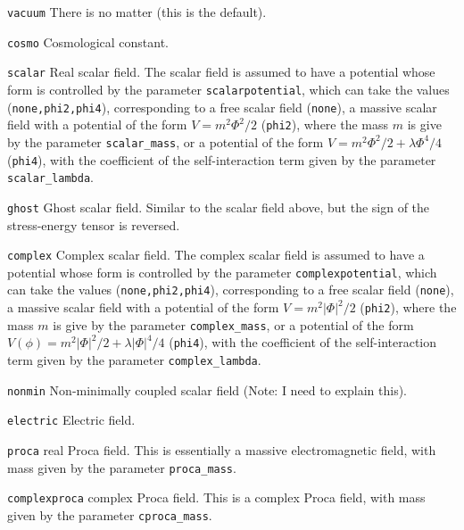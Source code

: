 \documentclass[12pt]{article}
\begin{document}
\begin{list}{}{
\setlength{\leftmargin}{35mm}
\setlength{\labelsep}{10mm}
\setlength{\labelwidth}{20mm}}

\item[\texttt{vacuum}] There is no matter (this is the default).

\item[\texttt{cosmo}] Cosmological constant.

\item[\texttt{scalar}] Real scalar field.  The scalar field is assumed
  to have a potential whose form is controlled by the parameter
  \texttt{scalarpotential}, which can take the values
  (\texttt{none,phi2,phi4}), corresponding to a free scalar field
  (\texttt{none}), a massive scalar field with a
  potential of the form $V=m^2 \Phi^2/2$
  (\texttt{phi2}), where the mass $m$ is give by the
  parameter \texttt{scalar\_mass}, or a potential of the form
  $V=m^2 \Phi^2/2 + \lambda \Phi^4 / 4$
  (\texttt{phi4}), with the coefficient of the
  self-interaction term given by the parameter
  \texttt{scalar\_lambda}.

\item[\texttt{ghost}] Ghost scalar field. Similar to the scalar field
  above, but the sign of the stress-energy tensor is reversed.

\item[\texttt{complex}] Complex scalar field.  The complex scalar
  field is assumed to have a potential whose form is controlled by the
  parameter \texttt{complexpotential}, which can take the values
  (\texttt{none,phi2,phi4}), corresponding to a free scalar field
  (\texttt{none}), a massive scalar field with a potential of the form
  $V=m^2 |\Phi|^2/2$ (\texttt{phi2}), where the mass $m$ is give by
  the parameter \texttt{complex\_mass}, or a potential of the form
  $V(\phi)=m^2 |\Phi|^2/2 + \lambda |\Phi|^4 / 4$ (\texttt{phi4}),
  with the coefficient of the self-interaction term given by the
  parameter \texttt{complex\_lambda}.

\item[\texttt{nonmin}] Non-minimally coupled scalar field (Note: I
  need to explain this).

\item[\texttt{electric}] Electric field.

\item[\texttt{proca}] real Proca field. This is essentially
a massive electromagnetic field, with mass given by the
parameter \texttt{proca\_mass}.

\item[\texttt{complexproca}] complex Proca field. This is a complex
  Proca field, with mass given by the parameter \texttt{cproca\_mass}.

\end{list}
\end{document}
